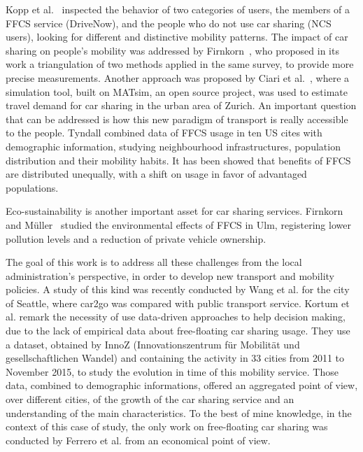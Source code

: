 Kopp et al.~\cite{Kopp2015} inspected the behavior of two categories of users, the members of a FFCS service (DriveNow), and the people who do not use car sharing (NCS users), looking for different and distinctive mobility patterns.
The impact of car sharing on people's mobility was addressed by Firnkorn~\cite{Firnkorn2012}, who proposed in its work a triangulation of two methods applied in the same survey, to provide more precise measurements.
Another approach was proposed by Ciari et al.~\cite{Ciari2013}, where a simulation tool, built on MATsim, an open source project, was used to estimate travel demand for car sharing in the urban area of Zurich.
An important question that can be addressed is how this new paradigm of transport is really accessible to the people. Tyndall \cite{Tyndall2016} combined data of FFCS usage in ten US cites with demographic information, studying neighbourhood infrastructures, population distribution and their mobility habits. It has been showed that  benefits of FFCS are distributed unequally, with a shift on usage in favor of advantaged populations.

Eco-sustainability is another important asset for car sharing services. Firnkorn and Müller~\cite{Firnkorn2011} studied the environmental effects of FFCS in Ulm, registering lower pollution levels and a reduction of private vehicle ownership.

The goal of this work is to address all these challenges from the local administration's perspective, in order to develop new transport and mobility policies.
A study of this kind was recently conducted by Wang et al. \cite{Wang2017} for the city of Seattle, where car2go was compared with public transport service.
Kortum et al. \cite{Kortum2016} remark the necessity of use data-driven approaches to help decision making, due to the lack of empirical data about free-floating car sharing usage. 
They use a dataset, obtained by InnoZ (Innovationszentrum für Mobilität und gesellschaftlichen Wandel) and containing the activity in 33 cities from 2011 to November 2015, to study the evolution in time of this mobility service. Those data, combined to demographic informations, offered an aggregated point of view, over different cities, of the growth of the car sharing service and an understanding of the main characteristics.
To the best of mine knowledge, in the context of this case of study, the only work on free-floating car sharing was conducted by Ferrero et al. \cite{Ferrero2016} from an economical point of view.

